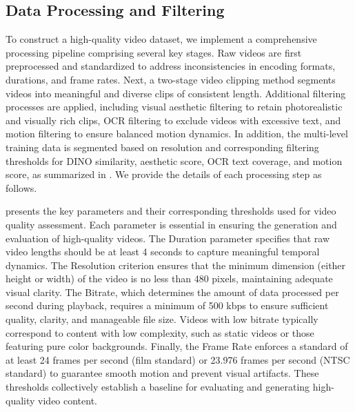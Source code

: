 \subsection{Data Processing and Filtering}
To construct a high-quality video dataset, we implement a comprehensive processing pipeline comprising several key stages. Raw videos are first preprocessed and standardized to address inconsistencies in encoding formats, durations, and frame rates. Next, a two-stage video clipping method segments videos into meaningful and diverse clips of consistent length. Additional filtering processes are applied, including visual aesthetic filtering to retain photorealistic and visually rich clips, OCR filtering to exclude videos with excessive text, and motion filtering to ensure balanced motion dynamics. In addition, the multi-level training data is segmented based on resolution and corresponding filtering thresholds for DINO similarity, aesthetic score, OCR text coverage, and motion score, as summarized in . We provide the details of each processing step as follows.



 presents the key parameters and their corresponding thresholds used for video quality assessment. Each parameter is essential in ensuring the generation and evaluation of high-quality videos. The Duration parameter specifies that raw video lengths should be at least 4 seconds to capture meaningful temporal dynamics. The Resolution criterion ensures that the minimum dimension (either height or width) of the video is no less than 480 pixels, maintaining adequate visual clarity. The Bitrate, which determines the amount of data processed per second during playback, requires a minimum of 500 kbps to ensure sufficient quality, clarity, and manageable file size. Videos with low bitrate typically correspond to content with low complexity, such as static videos or those featuring pure color backgrounds. Finally, the Frame Rate enforces a standard of at least 24 frames per second (film standard) or 23.976 frames per second (NTSC standard) to guarantee smooth motion and prevent visual artifacts. These thresholds collectively establish a baseline for evaluating and generating high-quality video content.

